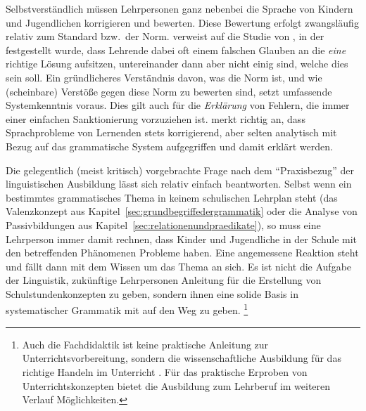 Selbstverständlich müssen Lehrpersonen ganz nebenbei die Sprache von Kindern und Jugendlichen korrigieren und bewerten.
Diese Bewertung erfolgt zwangsläufig relativ zum Standard bzw.\ der Norm.
\citet[7]{Eisenberg2004} verweist auf die Studie von \citet{Braun1979}, in der festgestellt wurde, dass Lehrende dabei oft einem falschen Glauben an die \textit{eine} richtige Lösung aufsitzen, untereinander dann aber nicht einig sind, welche dies sein soll.
Ein gründlicheres Verständnis davon, was die Norm ist, und wie (scheinbare) Verstöße gegen diese Norm zu bewerten sind, setzt umfassende Systemkenntnis voraus.
Dies gilt auch für die \textit{Erklärung} von Fehlern, die immer einer einfachen Sanktionierung vorzuziehen ist.
\citet[10]{Menzel2017} merkt richtig an, dass Sprachprobleme von Lernenden stets korrigierend, aber selten analytisch mit Bezug auf das grammatische System aufgegriffen und damit erklärt werden.

Die gelegentlich (meist kritisch) vorgebrachte Frage nach dem "`Praxisbezug"' der linguistischen Ausbildung lässt sich relativ einfach beantworten.
Selbst wenn ein bestimmtes grammatisches Thema in keinem schulischen Lehrplan steht (\zB das Valenzkonzept aus Kapitel~\ref{sec:grundbegriffedergrammatik} oder die Analyse von Passivbildungen aus Kapitel~\ref{sec:relationenundpraedikate}), so muss eine Lehrperson immer damit rechnen, dass Kinder und Jugendliche in der Schule mit den betreffenden Phänomenen Probleme haben.
Eine angemessene Reaktion steht und fällt dann mit dem Wissen um das Thema an sich.
Es ist nicht die Aufgabe der Linguistik, zukünftige Lehrpersonen Anleitung für die Erstellung von Schulstundenkonzepten zu geben, sondern ihnen eine solide Basis in systematischer Grammatik mit auf den Weg zu geben.%
\footnote{Auch die Fachdidaktik ist keine praktische Anleitung zur Unterrichtsvorbereitung, sondern die wissenschaftliche Ausbildung für das richtige Handeln im Unterricht \citep[15]{Bredel2013}.
Für das praktische Erproben von Unterrichtskonzepten bietet die Ausbildung zum Lehrberuf im weiteren Verlauf Möglichkeiten.}

